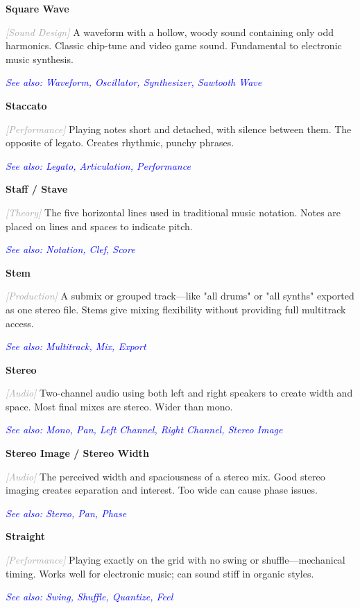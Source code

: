 \documentclass[11pt,letterpaper]{article}
\newcommand{\term}[1]{\textbf{\large\color{purple}#1}}
\newcommand{\category}[1]{\textcolor{darkgray}{\textit{\small [#1]}}}
\newcommand{\seealso}[1]{\textcolor{blue}{\textit{See also: #1}}}
\newenvironment{termdef}[1]
  {\noindent\term{#1}\par\nopagebreak}
  {\par\vspace{0.3em}}
\begin{document}
\begin{termdef}{Square Wave}
\category{Sound Design}
A waveform with a hollow, woody sound containing only odd harmonics. Classic chip-tune and video game sound. Fundamental to electronic music synthesis.

\seealso{Waveform, Oscillator, Synthesizer, Sawtooth Wave}
\end{termdef}

\begin{termdef}{Staccato}
\category{Performance}
Playing notes short and detached, with silence between them. The opposite of legato. Creates rhythmic, punchy phrases.

\seealso{Legato, Articulation, Performance}
\end{termdef}

\begin{termdef}{Staff / Stave}
\category{Theory}
The five horizontal lines used in traditional music notation. Notes are placed on lines and spaces to indicate pitch.

\seealso{Notation, Clef, Score}
\end{termdef}

\begin{termdef}{Stem}
\category{Production}
A submix or grouped track—like "all drums" or "all synths" exported as one stereo file. Stems give mixing flexibility without providing full multitrack access.

\seealso{Multitrack, Mix, Export}
\end{termdef}

\begin{termdef}{Stereo}
\category{Audio}
Two-channel audio using both left and right speakers to create width and space. Most final mixes are stereo. Wider than mono.

\seealso{Mono, Pan, Left Channel, Right Channel, Stereo Image}
\end{termdef}

\begin{termdef}{Stereo Image / Stereo Width}
\category{Audio}
The perceived width and spaciousness of a stereo mix. Good stereo imaging creates separation and interest. Too wide can cause phase issues.

\seealso{Stereo, Pan, Phase}
\end{termdef}

\begin{termdef}{Straight}
\category{Performance}
Playing exactly on the grid with no swing or shuffle—mechanical timing. Works well for electronic music; can sound stiff in organic styles.

\seealso{Swing, Shuffle, Quantize, Feel}
\end{termdef}
\end{document}
